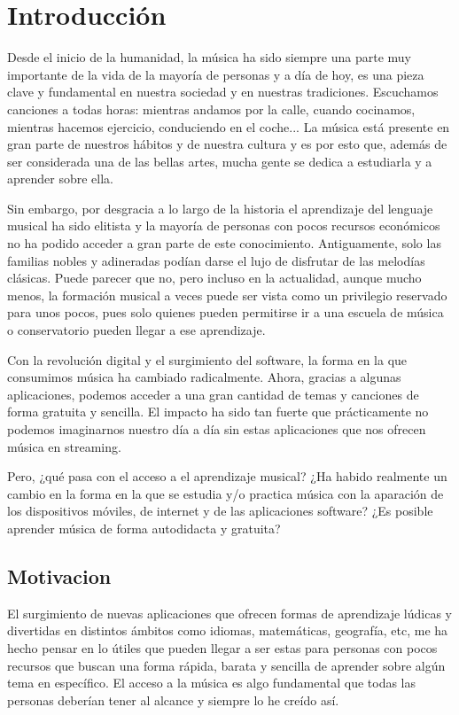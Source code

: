 \chapter{Introducción}
Desde el inicio de la humanidad, la música ha sido siempre una parte muy importante de la vida de la mayoría de personas y a día de hoy, es una pieza clave
 y fundamental en nuestra sociedad y en nuestras tradiciones. Escuchamos canciones a todas horas: mientras andamos por la calle, 
 cuando cocinamos, mientras hacemos ejercicio, conduciendo en el coche... La música está presente en gran
parte de nuestros hábitos y de nuestra cultura y es por esto que, además de ser considerada una de las
 bellas artes, mucha gente se dedica a estudiarla y a aprender sobre ella.

Sin embargo, por desgracia a lo largo de la historia el aprendizaje del lenguaje musical ha sido elitista y la mayoría
de personas con pocos recursos económicos no ha podido acceder a gran parte de este conocimiento. Antiguamente, solo
las familias nobles y adineradas podían darse el lujo de disfrutar de las melodías clásicas. Puede parecer que no, pero incluso en la actualidad,
aunque mucho menos, la formación musical a veces puede ser vista como un privilegio reservado para unos pocos, pues solo
quienes pueden permitirse ir a una escuela de música o conservatorio pueden llegar a ese aprendizaje.

Con la revolución digital y el surgimiento del software, la forma en la que consumimos música ha cambiado radicalmente.
Ahora, gracias a algunas aplicaciones, podemos acceder a una gran cantidad de temas y canciones de forma gratuita y sencilla.
El impacto ha sido tan fuerte que prácticamente no podemos imaginarnos nuestro día a día sin estas aplicaciones que nos ofrecen música en streaming.

Pero, ¿qué pasa con el acceso a el aprendizaje musical? ¿Ha habido realmente un cambio en la forma en la que se estudia y/o practica música
con la aparación de los dispositivos móviles, de internet y de las aplicaciones software? ¿Es posible aprender música de forma autodidacta y
gratuita?


\section{Motivacion}
El surgimiento de nuevas aplicaciones que ofrecen formas de aprendizaje lúdicas y divertidas en distintos ámbitos como idiomas, matemáticas, geografía, etc, 
me ha hecho pensar en lo útiles que pueden llegar a ser estas para personas con pocos recursos que buscan una forma rápida, barata y sencilla de aprender sobre
algún tema en específico. El acceso a la música es algo fundamental que todas las personas deberían tener al alcance y siempre lo he creído así. 

